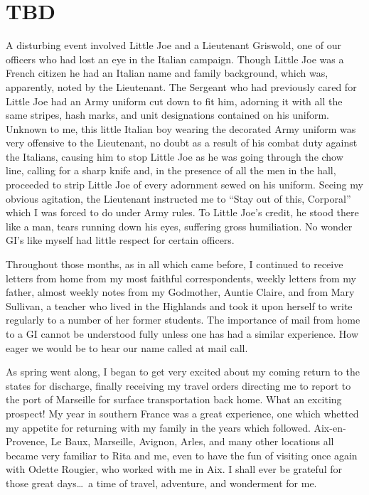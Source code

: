 \documentclass[../m3y]{subfiles}
\begin{document}
\section{TBD}
A disturbing event involved Little Joe and a Lieutenant Griswold, one of our officers who had lost an eye in the Italian campaign. Though Little Joe was a French citizen he had an Italian name and family background, which was, apparently, noted by the Lieutenant. The Sergeant who had previously cared for Little Joe had an Army uniform cut down to fit him, adorning it with all the same stripes, hash marks, and unit designations contained on his uniform. Unknown to me, this little Italian boy wearing the decorated Army uniform was very offensive to the Lieutenant, no doubt as a result of his combat duty against the Italians, causing him to stop Little Joe as he was going through the chow line, calling for a sharp knife and, in the presence of all the men in the hall, proceeded to strip Little Joe of every adornment sewed on his uniform. Seeing my obvious agitation, the Lieutenant instructed me to ``Stay out of this, Corporal'' which I was forced to do under Army rules. To Little Joe's credit, he stood there like a man, tears running down his eyes, suffering gross humiliation. No wonder GI's like myself had little respect for certain officers.

Throughout those months, as in all which came before, I continued to receive letters from home from my most faithful correspondents, weekly letters from my father, almost weekly notes from my Godmother, Auntie Claire, and from Mary Sullivan, a teacher who lived in the Highlands and took it upon herself to write regularly to a number of her former students. The importance of mail from home to a GI cannot be understood fully unless one has had a similar experience. How eager we would be to hear our name called at mail call.

As spring went along, I began to get very excited about my coming return to the states for discharge, finally receiving my travel orders directing me to report to the port of Marseille for surface transportation back home. What an exciting prospect! My year in southern France was a great experience, one which whetted my appetite for returning with my family in the years which followed. Aix-en-Provence, Le Baux, Marseille, Avignon, Arles, and many other locations all became very familiar to Rita and me, even to have the fun of visiting once again with Odette Rougier, who worked with me in Aix. I shall ever be grateful for those great days\ldots\ a time of travel, adventure, and wonderment for me.
\end{document}
